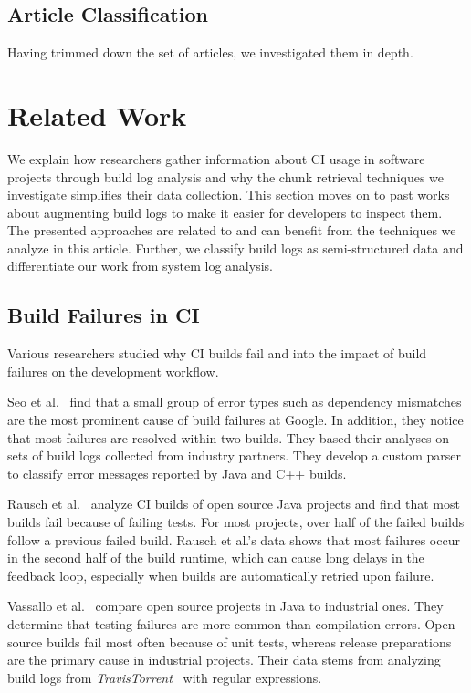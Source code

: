 \subsection{Article Classification}
Having trimmed down the set of articles, we investigated them in depth.



\section{Related Work}
\label{sec:rw}
We explain how researchers gather information about CI usage in software projects
through build log analysis and why the chunk retrieval techniques we investigate
simplifies their data collection.
This section moves on to past works about augmenting build logs to make it easier
for developers to inspect them.
The presented approaches are related to and can benefit from the techniques we
analyze in this article.
Further, we classify build logs as semi-structured data and differentiate our
work from system log analysis.

\subsection{Build Failures in CI}
Various researchers studied why CI builds fail and into the impact of build failures on the development workflow.

Seo et al.~\cite{seo2014programmers} find that a small group of error types such as dependency mismatches are the most prominent cause of build failures at Google.
In addition, they notice that most failures are resolved within two builds.
They based their analyses on sets of build logs collected from industry partners.
They develop a custom parser to classify error messages reported by Java and C++ builds.

Rausch et al.~\cite{rausch2017empirical} analyze CI builds of open source Java projects and find that most builds fail because of failing tests.
For most projects, over half of the failed builds follow a previous failed build.
Rausch et al.'s data shows that most failures occur in the second half of the build runtime, which can cause long delays in the feedback loop, especially when builds are automatically retried upon failure.

Vassallo et al.~\cite{vassallo2017a-tale} compare open source projects in Java to industrial ones.
They determine that testing failures are more common than compilation errors.
Open source builds fail most often because of unit tests, whereas release preparations are the primary cause in industrial projects.
Their data stems from analyzing build logs from \emph{TravisTorrent}~\cite{beller2017travistorrent} with regular expressions.

